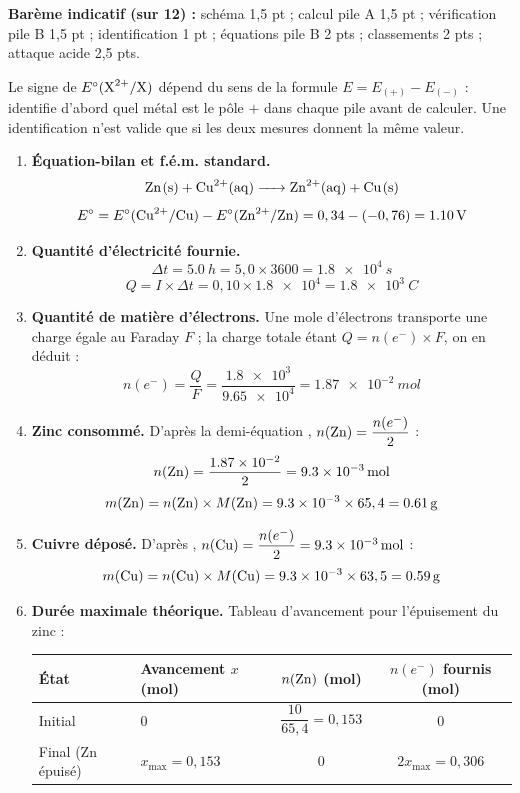 \documentclass[11pt]{article}
\begin{document}
\begin{corrige}
\begin{enumerate}
\begin{itemize}
\end{itemize}
\end{enumerate}
\textbf{Barème indicatif (sur 12) :} schéma 1,5 pt ; calcul pile A 1,5 pt ; vérification pile B 1,5 pt ; identification 1 pt ; équations pile B 2 pts ; classements 2 pts ; attaque acide 2,5 pts.
\begin{attention}
Le signe de $E^{\circ}(\ce{X^2+}/\ce{X})$ dépend du sens de la formule $E = E_{(+)} - E_{(-)}$ : identifie d'abord quel métal est le pôle $+$ dans chaque pile avant de calculer. Une identification n'est valide que si les deux mesures donnent la même valeur.
\end{attention}
\end{corrige}

\begin{corrige}
\begin{enumerate}
\item \textbf{Équation-bilan et f.é.m. standard.}
\[ \ce{Zn(s) + Cu^2+(aq) -> Zn^2+(aq) + Cu(s)} \]
\[ E^{\circ} = E^{\circ}(\ce{Cu^2+}/\ce{Cu}) - E^{\circ}(\ce{Zn^2+}/\ce{Zn}) = 0,34 - (-0,76) = \SI{+1,10}{V} \]
\item \textbf{Quantité d'électricité fournie.}
\[ \Delta t = \SI{5,0}{h} = 5,0 \times 3600 = \SI{1,8e4}{s} \]
\[ Q = I \times \Delta t = 0,10 \times \num{1,8e4} = \SI{1,8e3}{C} \]
\item \textbf{Quantité de matière d'électrons.} Une mole d'électrons transporte une charge égale au Faraday $F$ ; la charge totale étant $Q = n(e^-) \times F$, on en déduit :
\[ n(e^-) = \dfrac{Q}{F} = \dfrac{\num{1,8e3}}{\num{9,65e4}} = \SI{1,87e-2}{mol} \]
\item \textbf{Zinc consommé.} D'après la demi-équation , $n(\ce{Zn}) = \dfrac{n(e^-)}{2}$ :
\[ n(\ce{Zn}) = \dfrac{\num{1,87e-2}}{2} = \SI{9,3e-3}{mol} \]
\[ m(\ce{Zn}) = n(\ce{Zn}) \times M(\ce{Zn}) = \num{9,3e-3} \times 65,4 = \SI{0,61}{g} \]
\item \textbf{Cuivre déposé.} D'après , $n(\ce{Cu}) = \dfrac{n(e^-)}{2} = \SI{9,3e-3}{mol}$ :
\[ m(\ce{Cu}) = n(\ce{Cu}) \times M(\ce{Cu}) = \num{9,3e-3} \times 63,5 = \SI{0,59}{g} \]
\item \textbf{Durée maximale théorique.} Tableau d'avancement pour l'épuisement du zinc :

\begin{center}
\begin{tabularx}{\linewidth}{|l|X|c|c|}
\hline
\rowcolor{popblueL} \textbf{État} & \textbf{Avancement $x$ (mol)} & $n(\ce{Zn})$ (mol) & $n(e^-)$ fournis (mol) \\
\hline
Initial & $0$ & $\dfrac{10}{65,4} = 0,153$ & $0$ \\
\hline
Final (Zn épuisé) & $x_{\max} = 0,153$ & $0$ & $2x_{\max} = 0,306$ \\
\hline
\end{tabularx}
\end{center}


\end{enumerate}
\end{corrige}
\end{document}

